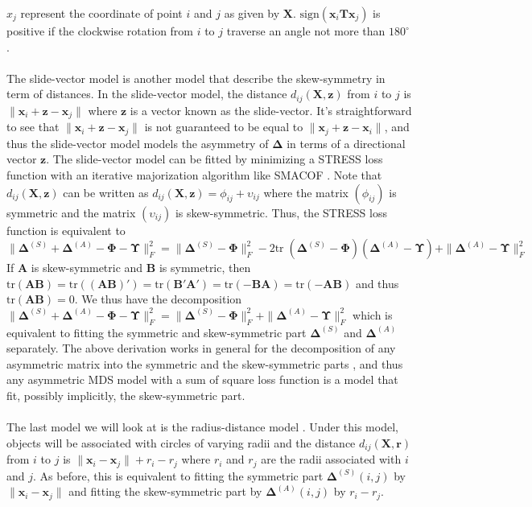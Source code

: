 $x_j$ represent the coordinate of point $i$ and $j$ as given by
$\mathbf{X}$. $\mathrm{sign}(\mathbf{x}_i \mathbf{T}
\mathbf{x}_j)$ is positive if the clockwise rotation from $i$ to $j$
traverse an angle not more than $180^\circ$. \\ \\
%
\noindent The slide-vector model is another model that describe the
skew-symmetry in term of distances. In the slide-vector model, the
distance $d_{ij}(\mathbf{X}, \mathbf{z})$ from $i$ to $j$ is 
$\| \mathbf{x}_i + \mathbf{z} - \mathbf{x}_j \|$ where $\mathbf{z}$
is a vector known as the slide-vector. It's straightforward to see that
$\| \mathbf{x}_i + \mathbf{z} - \mathbf{x}_j \|$ is not guaranteed to
be equal to $\| \mathbf{x}_j + \mathbf{z} - \mathbf{x}_i\|$, and thus
the slide-vector model models the asymmetry of $\bm{\Delta}$ in terms
of a directional vector $\mathbf{z}$. The slide-vector model can be
fitted by minimizing a STRESS loss function with an iterative
majorization algorithm like
SMACOF \citep{zielmand93:_analy}. Note that $d_{ij}(\mathbf{X},
\mathbf{z})$ can be written as $d_{ij}(\mathbf{X}, \mathbf{z}) =
\phi_{ij} + \upsilon_{ij}$ where the matrix $(\phi_{ij})$ is symmetric and
the matrix $(\upsilon_{ij})$ is skew-symmetric. Thus, the STRESS loss
function is equivalent to 
\begin{equation*}
\| \bm{\Delta}^{(S)} + \bm{\Delta}^{(A)} -
\bm{\Phi} - \bm{\Upsilon} \|^2_{F} = \| \bm{\Delta}^{(S)} -
\bm{\Phi}\|_{F}^{2} - 2 \mathrm{tr} \; (\bm{\Delta}^{(S)} - \bm{\Phi})
(\bm{\Delta}^{(A)} - \bm{\Upsilon}) + \| \bm{\Delta}^{(A)} -
\bm{\Upsilon} \|_{F}^{2}
\end{equation*}
If $\mathbf{A}$ is skew-symmetric and
$\mathbf{B}$ is symmetric, then $\mathrm{tr}(\mathbf{A}\mathbf{B}) =
\mathrm{tr}((\mathbf{A}\mathbf{B})') = \mathrm{tr}(\mathbf{B}'
\mathbf{A}') = \mathrm{tr}(- \mathbf{B} \mathbf{A}) = \mathrm{tr}(-
\mathbf{A} \mathbf{B})$ and thus $\mathrm{tr}(\mathbf{A}\mathbf{B}) =
0$. We thus have the decomposition $\| \bm{\Delta}^{(S)} + \bm{\Delta}^{(A)} -
\bm{\Phi} - \bm{\Upsilon} \|^2_{F} =  \| \bm{\Delta}^{(S)} -
\bm{\Phi}\|_{F}^{2} + \| \bm{\Delta}^{(A)} -
\bm{\Upsilon} \|_{F}^{2}$ which is equivalent to fitting the symmetric
and skew-symmetric part $\bm{\Delta}^{(S)}$ and $\bm{\Delta}^{(A)}$
separately. The above derivation works in general for the
decomposition of any asymmetric matrix into the symmetric and the
skew-symmetric parts
\citep{bove91:_metric}, and thus any asymmetric MDS model with a sum of
square loss function is a
model that fit, possibly implicitly, the skew-symmetric part.   
\\ \\ 
%
\noindent
The last model we will look at is the radius-distance model
\citep{okada87:_geomet}. Under this model, objects will be associated
with circles of varying radii and the distance $d_{ij}(\mathbf{X},
\mathbf{r})$ from $i$ to $j$ is $\|\mathbf{x}_i - \mathbf{x}_j\| + r_i
- r_j$ where $r_i$ and $r_j$ are the radii associated with $i$ and
$j$. As before, this is equivalent to fitting the symmetric part
$\bm{\Delta}^{(S)}(i,j)$ by $\|\mathbf{x}_i - \mathbf{x}_j\|$ and
fitting the skew-symmetric part by $\bm{\Delta}^{(A)}(i,j)$ by $r_i - r_j$.  

